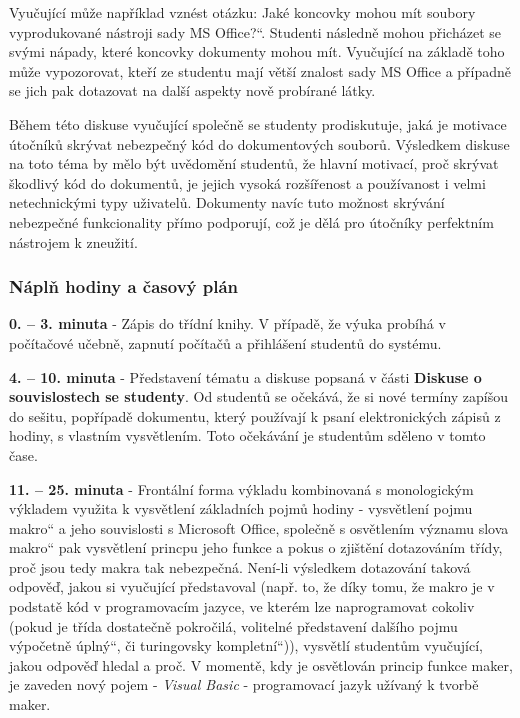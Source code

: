 \documentclass[a4paper, 12pt]{article}
\providecommand{\uv}[1]{\quotedblbase #1\textquotedblleft}
\begin{document}
Vyučující může například vznést otázku: \uv{Jaké koncovky mohou mít soubory vyprodukované nástroji sady MS Office?}. Studenti následně mohou přicházet se svými nápady, které koncovky dokumenty mohou mít. Vyučující na základě toho může vypozorovat, kteří ze studentu mají větší znalost sady MS Office a případně se jich pak dotazovat na další aspekty nově probírané látky. 

Během této diskuse vyučující společně se studenty prodiskutuje, jaká je motivace útočníků skrývat nebezpečný kód do dokumentových souborů. Výsledkem diskuse na toto téma by mělo být uvědomění studentů, že hlavní motivací, proč skrývat škodlivý kód do dokumentů, je jejich vysoká rozšířenost a používanost i velmi netechnickými typy uživatelů. Dokumenty navíc tuto možnost skrývání nebezpečné funkcionality přímo podporují, což je dělá pro útočníky perfektním nástrojem k zneužití.

\subsubsection{Náplň hodiny a časový plán}
\indent\textbf{0. -- 3. minuta} - Zápis do třídní knihy. V případě, že výuka probíhá v počítačové učebně, zapnutí počítačů a přihlášení studentů do systému.

\textbf{4. -- 10. minuta} - Představení tématu a diskuse popsaná v části \textbf{Diskuse o souvislostech se studenty}. Od studentů se očekává, že si nové termíny zapíšou do sešitu, popřípadě dokumentu, který používají k psaní elektronických zápisů z hodiny, s vlastním vysvětlením. Toto očekávání je studentům sděleno v tomto čase.

\textbf{11. -- 25. minuta} - Frontální forma výkladu kombinovaná s monologickým výkladem využita k vysvětlení základních pojmů hodiny - vysvětlení pojmu \uv{makro} a jeho souvislosti s Microsoft Office, společně s osvětlením významu slova \uv{makro} pak vysvětlení princpu jeho funkce a pokus o zjištění dotazováním třídy, proč jsou tedy makra tak nebezpečná. Není-li výsledkem dotazování taková odpověď, jakou si vyučující představoval (např. to, že díky tomu, že makro je v podstatě kód v programovacím jazyce, ve kterém lze naprogramovat cokoliv (pokud je třída dostatečně pokročilá, volitelné představení dalšího pojmu \uv{výpočetně úplný}, či \uv{turingovsky kompletní})), vysvětlí studentům vyučující, jakou odpověď hledal a proč. V momentě, kdy je osvětlován princip funkce maker, je zaveden nový pojem - \textit{Visual Basic} - programovací jazyk užívaný k tvorbě maker.
\end{document}
